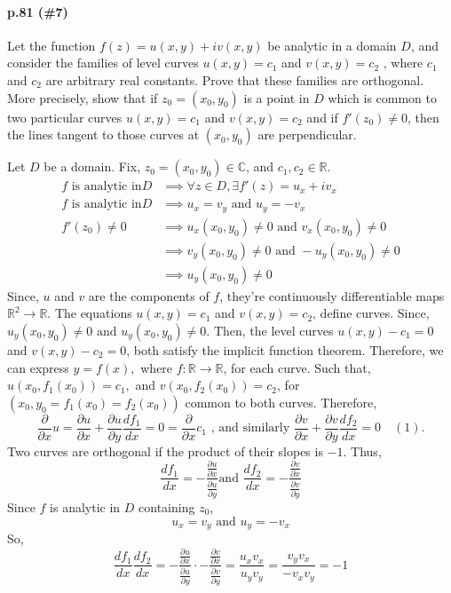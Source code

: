 \documentclass{article}
\newcommand\R{\mathbb{R}}
\newcommand\C{\mathbb{C}}
\begin{document}
\paragraph{p.81 \color{blue} (\#7) \color{black}}

Let the function $f (z) = u(x, y) + iv(x, y)$ be analytic in a domain $D$, and consider the
families of level curves $u(x, y) = c_1$ and $v(x, y) = c_2$ , where $c_1$ and $c_2$ are arbitrary
real constants. Prove that these families are orthogonal. More precisely, show that if
$z_0 = (x_0 , y_0)$ is a point in $D$ which is common to two particular curves $u(x, y) = c_1$
and $v(x, y) = c_2$ and if $f'  (z_0 ) \neq 0$, then the lines tangent to those curves at $(x_0 , y_0)$
are perpendicular.


Let $D$ be a domain. Fix, $z_0=(x_0,y_0)\in \C$, and $c_1,c_2\in \R$.
\begin{align*}
  f\text{ is analytic in} D &\implies \forall z\in D, \exists f'(z) =
  u_x+iv_x\\
  f\text{ is analytic in} D &\implies u_x = v_y\text{ and }u_y = -v_x\\
  f'(z_0)\neq 0 &\implies u_x(x_0,y_0)\neq0\text{ and }v_x(x_0,y_0)\neq 0\\
                            &\implies v_y(x_0,y_0)\neq 0\text{ and }-u_y(x_0,y_0) \neq
                              0\\
                            &\implies u_y(x_0,y_0)\neq 0
\end{align*}
Since, $u$ and $v$ are the components of $f$,
they're continuously differentiable maps $\R^2\rightarrow \R$. The equations $u(x,y)=c_1$ and $v(x,y)=c_2$, define curves.
Since, $u_y(x_0,y_0)\neq 0\text{ and }u_y(x_0,y_0)\neq 0\text{.}$
Then, the level curves $u(x,y)-c_1 = 0$ and $v(x,y)-c_2 = 0$, both
satisfy the implicit function theorem. Therefore, we can express $y =
f(x),$ where $f:\R\rightarrow\R$, for each curve. Such
that, $u(x_0,f_1(x_0))=c_1,$ and $v(x_0,f_2(x_0)) = c_2$, for
$(x_0,y_0=f_1(x_0) =f_2(x_0))$ common to both curves. Therefore,
\[\frac{\partial}{\partial{x}}u = \frac{\partial{u}}{\partial{x}}
  +\frac{\partial{u}}{\partial{y}}\frac{df_1}{dx} = 0 =
  \frac{\partial}{\partial{x}}c_1\text{ , and similarly } \frac{\partial{v}}{\partial{x}}
  +\frac{\partial{v}}{\partial{y}}\frac{df_2}{dx} = 0\quad (1)\text{
    .}\]
Two curves are orthogonal if the product of their slopes is
$-1$. Thus,
\[ \frac{df_1}{dx} =
  -\frac{\frac{\partial{u}}{\partial{x}}}{\frac{\partial{u}}{\partial{y}}}\text{
and } \frac{df_2}{dx} =
  -\frac{\frac{\partial{v}}{\partial{x}}}{\frac{\partial{v}}{\partial{y}}}\]
Since $f$ is analytic in $D$ containing $z_0$, \[u_x = v_y\text{ and } u_y = -v_x\]
So, \[ \frac{df_1}{dx}\frac{df_2}{dx} =
  -\frac{\frac{\partial{u}}{\partial{x}}}{\frac{\partial{u}}{\partial{y}}}
  \cdot-\frac{\frac{\partial{v}}{\partial{x}}}{\frac{\partial{v}}{\partial{y}}}
  = \frac{u_xv_x}{u_{y}v_{y}} =\frac{v_{y}v_x}{-v_xv_{y}} = -1 \]
\end{document}
